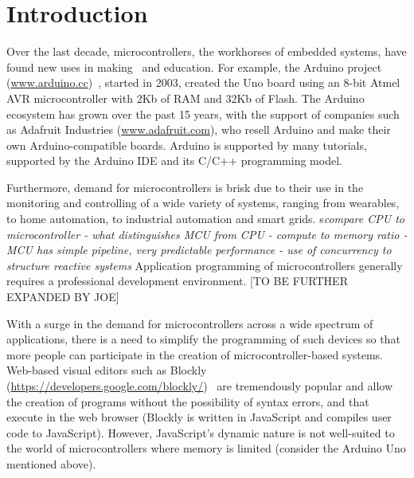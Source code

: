 \section{Introduction}
\label{sec:intro}

Over the last decade, microcontrollers, the workhorses of embedded systems, have found
new uses in making~\cite{dougherty2012maker} and education. For example, the Arduino project
(\url{www.arduino.cc})~\cite{buildingArduino2014},
started in 2003, created the Uno board using an 8-bit Atmel
AVR microcontroller with 2Kb of RAM and 32Kb of Flash. 
The Arduino ecosystem has grown over the past 15 years,
with the support of companies such as Adafruit Industries (\url{www.adafruit.com}), 
who resell Arduino and make their own Arduino-compatible boards. Arduino is supported
by many tutorials, supported by the Arduino IDE and its C/C++ programming model.

Furthermore, demand for microcontrollers is brisk due to their use in the monitoring and controlling
of a wide variety of systems, ranging from wearables, to home automation, to industrial 
automation and smart grids. s\emph{compare CPU to microcontroller - what distinguishes MCU from CPU - 
compute to memory ratio - MCU has simple pipeline, very predictable performance - use of concurrency
to structure reactive systems}
Application programming of microcontrollers generally requires a professional
development environment. [TO BE FURTHER EXPANDED BY JOE]

With a surge in the demand for microcontrollers across a wide
spectrum of applications, there is a need to simplify the programming 
of such devices so that more people can participate in the creation 
of microcontroller-based systems. Web-based visual editors such as 
Blockly (\url{https://developers.google.com/blockly/})~\cite{Blocky2015}
are tremendously popular and allow the creation of programs without the 
possibility of syntax errors, and that execute in the web browser (Blockly
is written in JavaScript and compiles user code to JavaScript).
However, JavaScript's dynamic nature is not well-suited to the world of 
microcontrollers where memory is limited (consider the Arduino Uno mentioned above).


